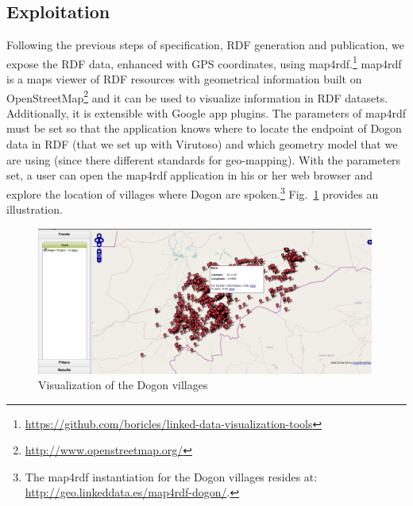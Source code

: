 
\subsection{Exploitation}
Following the previous steps of specification, RDF generation and publication, we expose the RDF data, enhanced with GPS coordinates, using map4rdf.\footnote{\url{https://github.com/boricles/linked-data-visualization-tools}} map4rdf is a maps viewer of RDF resources with geometrical information built on OpenStreetMap\footnote{\url{http://www.openstreetmap.org/}} and it can be used to visualize information in RDF datasets. Additionally, it is extensible with Google app plugins. The parameters of map4rdf must be set so that the application knows where to locate the endpoint of Dogon data in RDF (that we set up with Virutoso) and which geometry model that we are using (since there different standards for geo-mapping). With the parameters set, a user can open the map4rdf application in his or her web browser and explore the location of villages where Dogon are spoken.\footnote{The map4rdf instantiation for the Dogon villages resides at: \url{http://geo.linkeddata.es/map4rdf-dogon/}.} Fig.\ \ref{fig:map4rdf} provides an illustration.

\begin{figure}[htb!p]
\centering
\includegraphics[width=0.99\textwidth]{img/map4rdf.png}
\caption{Visualization of the Dogon villages}
\label{fig:map4rdf}
\end{figure}

